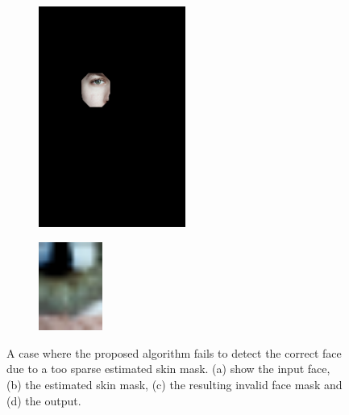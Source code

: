 \begin{figure}[H]
\begin{subfigure}{.25\textwidth}
  \centering
  \includegraphics[width=0.53\textwidth]{img/fd3/fail2_faceImage.png}
  \caption{}
\end{subfigure}%
\begin{subfigure}{.25\textwidth}
  \centering
  \includegraphics[width=0.23\textwidth]{img/fd3/fail2_output.png}
  \caption{}
\end{subfigure}%

\caption{A case where the proposed algorithm fails to detect the correct face due to a too sparse estimated skin mask. (a) show the input face, (b) the estimated skin mask, (c) the resulting invalid face mask and (d) the output.}
\label{fig:fail2}
\end{figure}




